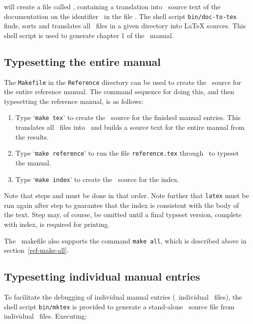 \noindent will create a file called \file, containing a translation into
\latex\ source text of the documentation on the identifier \id\ in the file
\id\doc.  The shell script {\tt bin/doc-to-tex} finds, sorts and translates all
\doc\ files in a given directory into LaTeX sources. This shell script is used
to generate chapter 1 of the \REFERENCE\ manual.

\subsection{Typesetting the entire manual}\label{ref-make}

The {\tt Makefile} in the {\tt Reference} directory can be used to create the
\latex\ source for the entire reference manual.  The command sequence for
doing this, and then typesetting the reference manual, is as follows:

\begin{enumerate}

\item Type `{\tt make tex}' to create the \latex\ source for the finished
manual entries.  This translates all \doc\ files into \latex\ and builds a
source text for the entire manual from the results.

\item Type `{\tt make reference}' to run the file {\tt reference.tex} through
\latex\ to typeset the manual.

\item Type `{\tt make index}' to create the \latex\ source for the index.

\end{enumerate}

\noindent Note that steps  and  must be done in that order.
Note further that {\tt latex} must be run again after step  to
guarantee that the index is consistent with the body of the text. Step 
may, of course, be omitted until a final typeset version, complete with index,
is required for printing.

The \REFERENCE\ makefile also supports the command {\tt make all}, which is
described above in section~\ref{ref-make-all}.

\subsection{Typesetting individual manual entries}

To facilitate the debugging of individual manual entries (\ie\ individual \doc\
files), the shell script {\tt bin/mktex} is provided to generate a stand-alone
\latex\ source file from individual \doc\ files.  Executing:

